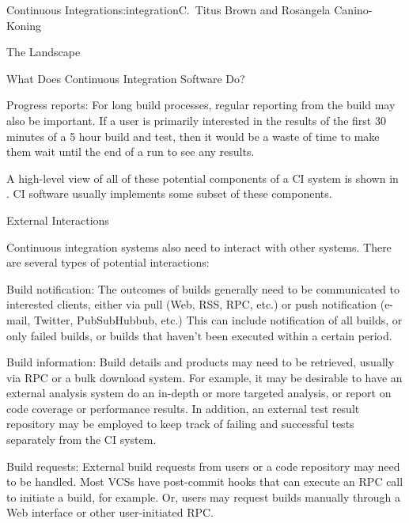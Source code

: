 \begin{aosachapter}{Continuous Integration}{s:integration}{C.\ Titus Brown and Rosangela Canino-Koning}
\begin{aosasect1}{The Landscape}
\begin{aosasect2}{What Does Continuous Integration Software Do?}
\begin{aosadescription}
  \item{Progress reports:} For long build processes, regular
  reporting from the build may also be important. If a user is
  primarily interested in the results of the first 30 minutes of a 5
  hour build and test, then it would be a waste of time to make them
  wait until the end of a run to see any results.

\end{aosadescription}

A high-level view of all of these potential components of a CI system
is shown in . CI software usually
implements some subset of these components.

\end{aosasect2}

\begin{aosasect2}{External Interactions}

Continuous integration systems also need to interact with other
systems. There are several types of potential interactions:

\begin{aosadescription}

  \item{Build notification}: The outcomes of builds generally
  need to be communicated to interested clients, either via pull
  (Web, RSS, RPC, etc.) or push notification (e-mail, Twitter,
  PubSubHubbub, etc.) This can include notification of all builds,
  or only failed builds, or builds that haven't been executed within
  a certain period.

  \item{Build information}: Build details and products may need
  to be retrieved, usually via RPC or a bulk download system. For
  example, it may be desirable to have an external analysis system
  do an in-depth or more targeted analysis, or report on code
  coverage or performance results. In addition, an external test
  result repository may be employed to keep track of failing and
  successful tests separately from the CI system.

  \item{Build requests}: External build requests from users or a
  code repository may need to be handled. Most VCSs have post-commit
  hooks that can execute an RPC call to initiate a build, for
  example. Or, users may request builds manually through a Web
  interface or other user-initiated RPC.


\end{aosadescription}
\end{aosasect2}
\end{aosasect1}
\end{aosachapter}
